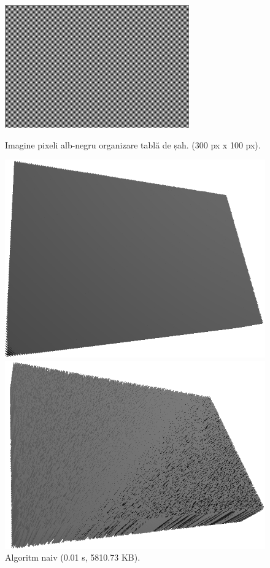 \documentclass[12pt]{article}
\begin{document}
\begin{figure}[!htb]
	\begin{minipage}{0.24\textwidth}
		\centering
		\includegraphics[width=.95\linewidth]{Sah/SahImg.png}
		\caption{Imagine pixeli alb-negru organizare tablă de șah. (300 px x 100 px).}\label{fig:fig29}
	\end{minipage}\hfill
        \begin{minipage}{0.24\textwidth}
		\centering
		\includegraphics[width=.95\linewidth]{Sah/SahNaiv.png}
		\caption{Algoritm naiv (0.01 s, 5810.73 KB).}\label{fig:fig30}
	\end{minipage}\hfill
        \begin{minipage}{0.24\textwidth}
		\centering
		\includegraphics[width=.95\linewidth]{Sah/SahDelaunay001.png}

\end{minipage}
\end{figure}
\end{document}
